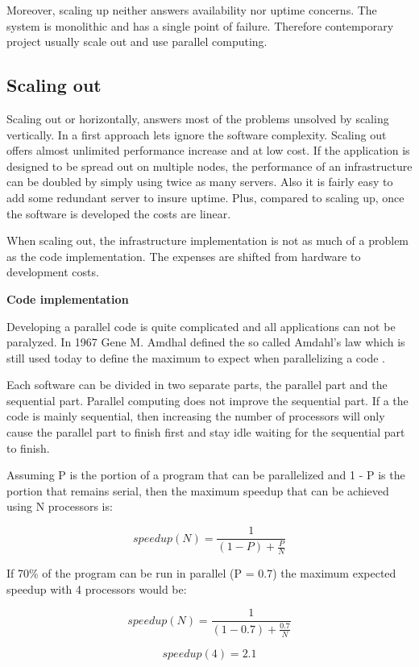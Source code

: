 Moreover, scaling up neither answers availability nor uptime concerns. The
system is monolithic and has a single point of failure. Therefore contemporary
project usually scale out and use parallel computing.

\subsection{Scaling out}
				
Scaling out or horizontally, answers most of the problems unsolved by scaling
vertically. In a first approach lets ignore the software complexity.  Scaling
out offers almost unlimited performance increase and at low cost. If the
application is designed to be spread out on multiple nodes, the performance of
an infrastructure can be doubled by simply using twice as many servers. Also it
is fairly easy to add some redundant server to insure uptime. Plus, compared to
scaling up, once the software is developed the costs are linear.

When scaling out, the infrastructure implementation is not as much of a problem as
the code implementation. The expenses are shifted from hardware to development
costs.

\textbf{Code implementation}

Developing a parallel code is quite complicated and all applications can not
be paralyzed. In 1967 Gene M. Amdhal defined the so called Amdahl's law which
is still used today to define the maximum to expect when parallelizing a code
\citep{Reference10}. 

Each software can be divided in two separate parts, the parallel part and the
sequential part. Parallel computing does not improve the sequential part. If a
the code is mainly sequential, then increasing the number of processors will
only cause the parallel part to finish first and stay idle waiting for the
sequential part to finish.

Assuming P is the portion of a program that can be parallelized and 1 - P  is
the portion that remains serial, then the maximum speedup that can be achieved
using N processors is: 

$$speedup(N) = \frac{1}{(1-P) + \frac{P}{N}} $$

If 70\% of the program can be run in parallel (P = 0.7) the maximum expected
speedup with 4 processors would be:

$$speedup(N) = \frac{1}{(1-0.7) + \frac{0.7}{N}}$$

$$speedup(4) = 2.1$$

